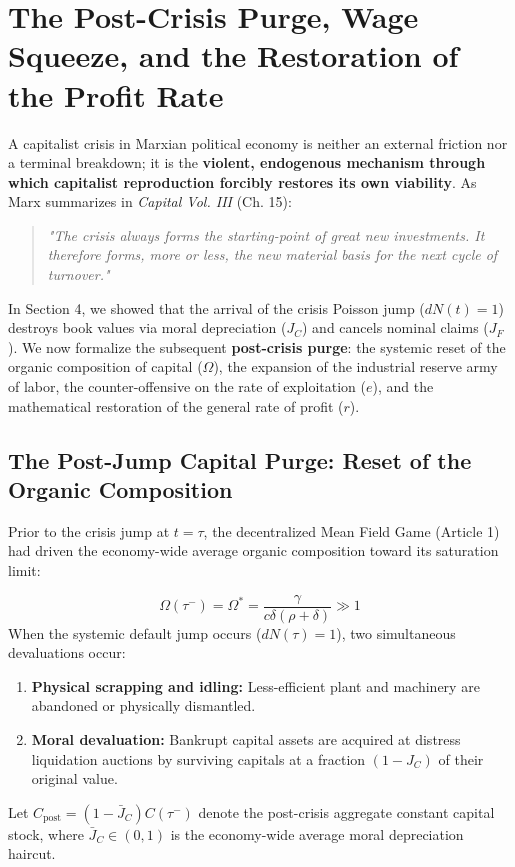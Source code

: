 \documentclass[11pt,letterpaper]{report}
\begin{document}
\section{The Post-Crisis Purge, Wage Squeeze, and the Restoration of the Profit Rate}
A capitalist crisis in Marxian political economy is neither an external friction nor a terminal breakdown; it is the \textbf{violent, endogenous mechanism through which capitalist reproduction forcibly restores its own viability}. As Marx summarizes in \emph{Capital Vol. III} (Ch. 15):

\begin{quote}
\emph{"The crisis always forms the starting-point of great new investments. It therefore forms, more or less, the new material basis for the next cycle of turnover."}
\end{quote}

In Section 4, we showed that the arrival of the crisis Poisson jump ($dN(t)=1$) destroys book values via moral depreciation (${J}_{C}$) and cancels nominal claims (${J}_{F}$). We now formalize the subsequent \textbf{post-crisis purge}: the systemic reset of the organic composition of capital ($\Omega$), the expansion of the industrial reserve army of labor, the counter-offensive on the rate of exploitation ($e$), and the mathematical restoration of the general rate of profit ($r$).

\subsection{The Post-Jump Capital Purge: Reset of the Organic Composition}
Prior to the crisis jump at $t=\tau$, the decentralized Mean Field Game (Article 1) had driven the economy-wide average organic composition toward its saturation limit:

\[
\Omega ({\tau }^{-})={\Omega }^{*}=\frac{\gamma }{c\delta (\rho +\delta )}\gg 1
\]
When the systemic default jump occurs ($dN(\tau )=1$), two simultaneous devaluations occur:

\begin{enumerate}
\item \textbf{Physical scrapping and idling:} Less-efficient plant and machinery are abandoned or physically dismantled.
\item \textbf{Moral devaluation:} Bankrupt capital assets are acquired at distress liquidation auctions by surviving capitals at a fraction $(1-{J}_{C})$ of their original value.
\end{enumerate}
Let ${C}_{\mathrm{post}}=(1-{\bar{J}}_{C})C({\tau }^{-})$ denote the post-crisis aggregate constant capital stock, where ${\bar{J}}_{C}\in (0,1)$ is the economy-wide average moral depreciation haircut.
\end{document}
